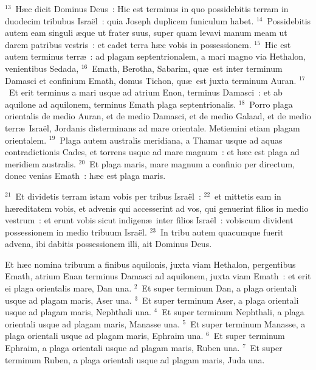 ${}^{13}$~H\ae c dicit Dominus Deus~: Hic est terminus in quo possidebitis terram in duodecim tribubus Isra\"el~: quia Joseph duplicem funiculum habet.
${}^{14}$~Possidebitis autem eam singuli \ae que ut frater suus, super quam levavi manum meam ut darem patribus vestris~: et cadet terra h\ae c vobis in possessionem.
${}^{15}$~Hic est autem terminus terr\ae~: ad plagam septentrionalem, a mari magno via Hethalon, venientibus Sedada,
${}^{16}$~Emath, Berotha, Sabarim, qu\ae\ est inter terminum Damasci et confinium Emath, domus Tichon, qu\ae\ est juxta terminum Auran.
${}^{17}$~Et erit terminus a mari usque ad atrium Enon, terminus Damasci~: et ab aquilone ad aquilonem, terminus Emath plaga septentrionalis.
${}^{18}$~Porro plaga orientalis de medio Auran, et de medio Damasci, et de medio Galaad, et de medio terr\ae\ Isra\"el, Jordanis disterminans ad mare orientale. Metiemini etiam plagam orientalem.
${}^{19}$~Plaga autem australis meridiana, a Thamar usque ad aquas contradictionis Cades, et torrens usque ad mare magnum~: et h\ae c est plaga ad meridiem australis.
${}^{20}$~Et plaga maris, mare magnum a confinio per directum, donec venias Emath~: h\ae c est plaga maris.


${}^{21}$~Et dividetis terram istam vobis per tribus Isra\"el~:
${}^{22}$~et mittetis eam in h\ae reditatem vobis, et advenis qui accesserint ad vos, qui genuerint filios in medio vestrum~: et erunt vobis sicut indigen\ae\ inter filios Isra\"el~: vobiscum divident possessionem in medio tribuum Isra\"el.
${}^{23}$~In tribu autem quacumque fuerit advena, ibi dabitis possessionem illi, ait Dominus Deus.

\bchapter
\lettrine[lines=3,image=true,loversize=0.05,lraise=-0.03]{E}{}t h\ae c nomina tribuum a finibus aquilonis, juxta viam Hethalon, pergentibus Emath, atrium Enan terminus Damasci ad aquilonem, juxta viam Emath~: et erit ei plaga orientalis mare, Dan una.
${}^{2}$~Et super terminum Dan, a plaga orientali usque ad plagam maris, Aser una.
${}^{3}$~Et super terminum Aser, a plaga orientali usque ad plagam maris, Nephthali una.
${}^{4}$~Et super terminum Nephthali, a plaga orientali usque ad plagam maris, Manasse una.
${}^{5}$~Et super terminum Manasse, a plaga orientali usque ad plagam maris, Ephraim una.
${}^{6}$~Et super terminum Ephraim, a plaga orientali usque ad plagam maris, Ruben una.
${}^{7}$~Et super terminum Ruben, a plaga orientali usque ad plagam maris, Juda una.


